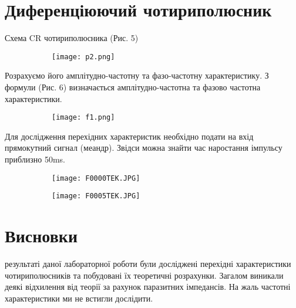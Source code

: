 \documentclass[a4paper,12pt]{article}
\begin{document}
\section{Диференціюючий чотириполюсник}
\quad Схема CR чотириполюсника (Рис. 5) 
\par\quad\begin{figure}[!h]
  \centering
 \begin{subfigure}[b]{0.6\linewidth}
    \texttt{[image: p2.png]}
  \end{subfigure}
  \caption{}
\end{figure}
\par\quad Розрахуємо його амплітудно-частотну та фазо-частотну характеристику. З формули (Рис. 6) визначається амплітудно-частотна та фазово частотна характеристики.  
\par\quad\begin{figure}[!h]
  \centering
 \begin{subfigure}[b]{0.6\linewidth}
    \texttt{[image: f1.png]}
  \end{subfigure}
  \caption{}
\end{figure}
\clearpage
\par\quad Для дослідження перехідних характеристик необхідно подати на вхід прямокутний сигнал (меандр). Звідси можна знайти час наростання імпульсу приблизно 50ms.  
\par\quad\begin{figure}[!h]
  \centering
 \begin{subfigure}[b]{1\linewidth}
    \texttt{[image: F0000TEK.JPG]}
  \end{subfigure}
  \caption{}
\end{figure}
\par\quad\begin{figure}[!h]
  \centering
 \begin{subfigure}[b]{1\linewidth}
    \texttt{[image: F0005TEK.JPG]}
  \end{subfigure}
  \caption{}
\end{figure}
\clearpage
\section{Висновки}
\par{} результаті даної лабораторної роботи були досліджені перехідні характеристики чотириполюсників та побудовані їх теоретичні розрахунки. Загалом виникали деякі відхилення від теорії за рахунок паразитних імпедансів. На жаль частотні характеристики ми не встигли дослідити.
\end{document}
